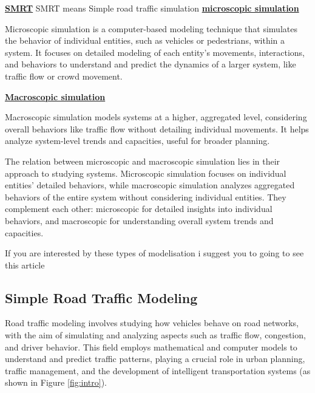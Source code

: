 \documentclass{article}
\begin{document}
		\textbf{\underline{SMRT}} 
		SMRT means Simple road traffic simulation \newline\newline
		\textbf{\underline{microscopic simulation}} 
		
		Microscopic simulation is a computer-based modeling technique that simulates the behavior of individual entities, such as vehicles or pedestrians, within a system. It focuses on detailed modeling of each entity's movements, interactions, and behaviors to understand and predict the dynamics of a larger system, like traffic flow or crowd movement. \newline\newline
		
		\textbf{\underline{Macroscopic simulation}} 
		
		Macroscopic simulation models systems at a higher, aggregated level, considering overall behaviors like traffic flow without detailing individual movements. It helps analyze system-level trends and capacities, useful for broader planning.
		
		The relation between microscopic and macroscopic simulation lies in their approach to studying systems. Microscopic simulation focuses on individual entities' detailed behaviors, while macroscopic simulation analyzes aggregated behaviors of the entire system without considering individual entities. They complement each other: microscopic for detailed insights into individual behaviors, and macroscopic for understanding overall system trends and capacities. \newline\newline
		
		If you are interested by these types of modelisation i suggest you to going to see this article \cite{dugois:tel-01505473}
	
	\subsection{Simple Road Traffic Modeling}
	
		Road traffic modeling involves studying how vehicles behave on road networks, with the aim of simulating and analyzing aspects such as traffic flow, congestion, and driver behavior. This field employs mathematical and computer models to understand and predict traffic patterns, playing a crucial role in urban planning, traffic management, and the development of intelligent transportation systems (as shown in Figure \ref{fig:intro}). 
		
\end{document}
